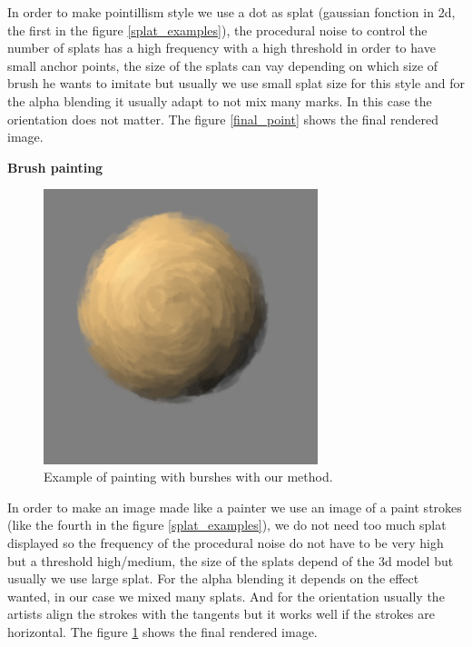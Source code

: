 In order to make pointillism style we use a dot as splat (gaussian fonction in 2d, the first in the figure \ref{splat_examples}), the procedural noise to control the number of splats has a high frequency with a high threshold in order to have small anchor points, the size of the splats can vay depending on which size of brush he wants to imitate but usually we use small splat size for this style and for the alpha blending it usually adapt to not mix many marks. In this case the orientation does not matter. The figure \ref{final_point} shows the final rendered image. \newline

\textbf{Brush painting}

\begin{figure}
    \begin{center}
    \includegraphics[width=80mm, height=80mm]{Resultats/painting1/final.png}
    \end{center}
    \caption{Example of painting with burshes with our method.}
    \label{final_brushes}
\end{figure}

In order to make an image made like a painter we use an image of a paint strokes (like the fourth in the figure \ref{splat_examples}), we do not need too much splat displayed so the frequency of the procedural noise do not have to be very high but a threshold high/medium, the size of the splats depend of the 3d model but usually we use large splat. For the alpha blending it depends on the effect wanted, in our case we mixed many splats. And for the orientation usually the artists align the strokes with the tangents but it works well if the strokes are horizontal. The figure \ref{final_brushes} shows the final rendered image. \newline

